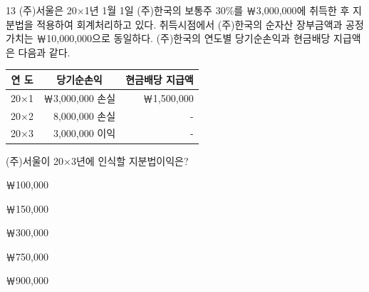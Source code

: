 \begin{question}{13}
(주)서울은 20×1년 1월 1일 (주)한국의 보통주 30\%를 ￦3,000,000에 취득한 후 지분법을 적용하여 회계처리하고 있다. 취득시점에서 (주)한국의 순자산 장부금액과 공정가치는 ￦10,000,000으로 동일하다. (주)한국의 연도별 당기순손익과 현금배당 지급액은 다음과 같다.

{\small\centering
\begin{tabular}{|c|r|r|}
\hline
연 도 & \multicolumn{1}{c|}{당기순손익} & \multicolumn{1}{c|}{현금배당 지급액} \\
\hline
20×1 & ￦3,000,000 손실 & ￦1,500,000 \\
\hline
20×2 & 8,000,000 손실 & - \\
\hline
20×3 & 3,000,000 이익 & - \\
\hline
\end{tabular}\par}

(주)서울이 20×3년에 인식할 지분법이익은? \par
\begin{choices}
  \item ￦100,000
  \item ￦150,000
  \item ￦300,000
  \item ￦750,000
  \item ￦900,000
\end{choices}
\end{question}
